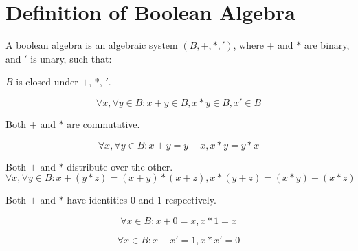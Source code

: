 
\section {Definition of Boolean Algebra}

A boolean algebra is an algebraic system $(B, +, *, ')$,
where $+$ and $*$ are binary, and $'$ is unary, such that:

\begin{axiom}[Closure]
$B$ is closed under $+$, $*$, $'$.

\[ \forall x, \forall y \in B : x + y \in B, x * y \in B, x' \in B \]
\end{axiom}

\begin{axiom}\label{commutative}
Both $+$ and $*$ are commutative.

\[ \forall x, \forall y \in B : x + y = y + x , x * y = y * x \]
\end{axiom}

\begin{axiom}\label{distributive}
Both $+$ and $*$ distribute over the other.
\[ \forall x, \forall y \in B :
    x + (y * z) = (x + y) * (x + z) ,
    x * (y + z) = (x * y) + (x * z) \]
\end{axiom}

\begin{axiom}\label{identity}

Both $+$ and $*$ have identities $0$ and $1$ respectively.

\[ \forall x \in B : x + 0 = x , x * 1 = x \]
\end{axiom}

\begin{axiom}\label{complement}
\[ \forall x \in B : x + x' = 1 , x * x' = 0 \]
\end{axiom}

\newpage

